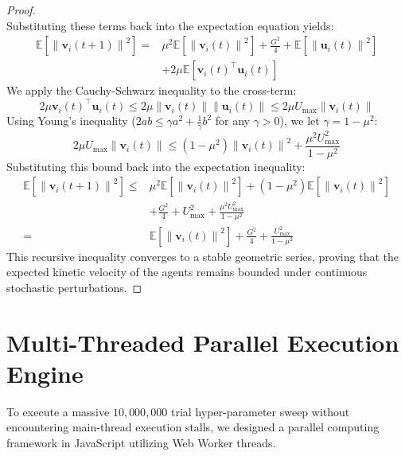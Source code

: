 \documentclass[letterpaper, 10pt, conference]{IEEEtran}
\newcommand{\norm}[1]{\left\lVert#1\right\rVert}
\begin{document}
\begin{proof}
\begin{equation}
\end{equation}
Substituting these terms back into the expectation equation yields:
\begin{align}
    \mathbb{E}\left[\norm{\mathbf{v}_i(t+1)}^2\right] = &\mu^2 \mathbb{E}\left[\norm{\mathbf{v}_i(t)}^2\right] + \frac{G^2}{4} + \mathbb{E}\left[\norm{\mathbf{u}_i(t)}^2\right] \nonumber \\
    &+ 2\mu \mathbb{E}\left[\mathbf{v}_i(t)^\top \mathbf{u}_i(t)\right]
\end{align}
We apply the Cauchy-Schwarz inequality to the cross-term:
\begin{equation}
    2\mu \mathbf{v}_i(t)^\top \mathbf{u}_i(t) \leq 2\mu \norm{\mathbf{v}_i(t)} \norm{\mathbf{u}_i(t)} \leq 2\mu U_{\max} \norm{\mathbf{v}_i(t)}
\end{equation}
Using Young's inequality ($2ab \leq \gamma a^2 + \frac{1}{\gamma} b^2$ for any $\gamma > 0$), we let $\gamma = 1 - \mu^2$:
\begin{equation}
    2\mu U_{\max} \norm{\mathbf{v}_i(t)} \leq (1 - \mu^2) \norm{\mathbf{v}_i(t)}^2 + \frac{\mu^2 U_{\max}^2}{1 - \mu^2}
\end{equation}
Substituting this bound back into the expectation inequality:
\begin{align}
    \mathbb{E}\left[\norm{\mathbf{v}_i(t+1)}^2\right] \leq &\mu^2 \mathbb{E}\left[\norm{\mathbf{v}_i(t)}^2\right] + (1 - \mu^2)\mathbb{E}\left[\norm{\mathbf{v}_i(t)}^2\right] \nonumber \\
    &+ \frac{G^2}{4} + U_{\max}^2 + \frac{\mu^2 U_{\max}^2}{1 - \mu^2} \nonumber \\
    = &\mathbb{E}\left[\norm{\mathbf{v}_i(t)}^2\right] + \frac{G^2}{4} + \frac{U_{\max}^2}{1 - \mu^2}
\end{align}
This recursive inequality converges to a stable geometric series, proving that the expected kinetic velocity of the agents remains bounded under continuous stochastic perturbations.
\end{proof}

\section{Multi-Threaded Parallel Execution Engine}
\label{sec:simulation}

To execute a massive $10{,}000{,}000$ trial hyper-parameter sweep without encountering main-thread execution stalls, we designed a parallel computing framework in JavaScript utilizing Web Worker threads.
\end{document}
